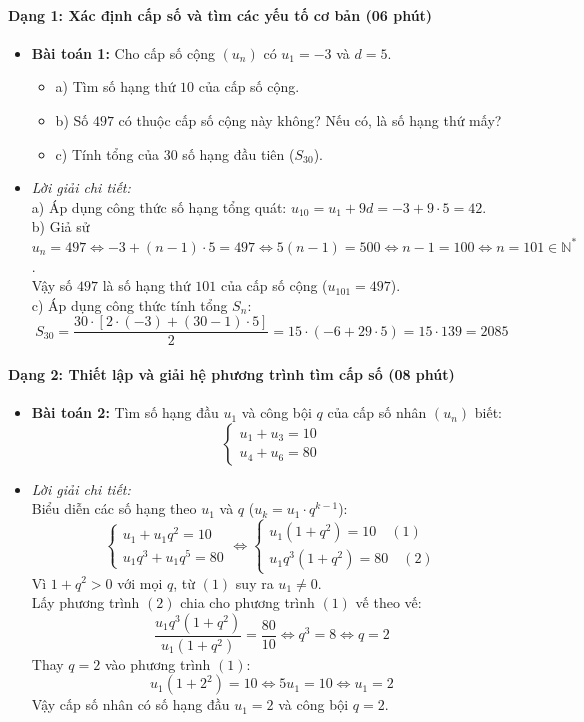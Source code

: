 \documentclass[12pt, a4paper]{article}
\begin{document}
\paragraph{Dạng 1: Xác định cấp số và tìm các yếu tố cơ bản (06 phút)}
\begin{itemize}
    \item \textbf{Bài toán 1:} Cho cấp số cộng $(u_n)$ có $u_1 = -3$ và $d = 5$.
    \begin{itemize}
        \item a) Tìm số hạng thứ $10$ của cấp số cộng.
        \item b) Số $497$ có thuộc cấp số cộng này không? Nếu có, là số hạng thứ mấy?
        \item c) Tính tổng của $30$ số hạng đầu tiên ($S_{30}$).
    \end{itemize}
    \item \textit{Lời giải chi tiết:}\\
    a) Áp dụng công thức số hạng tổng quát: $u_{10} = u_1 + 9d = -3 + 9 \cdot 5 = 42$.\\
    b) Giả sử $u_n = 497 \iff -3 + (n - 1) \cdot 5 = 497 \iff 5(n - 1) = 500 \iff n - 1 = 100 \iff n = 101 \in \mathbb{N}^*$.\\
    Vậy số $497$ là số hạng thứ $101$ của cấp số cộng ($u_{101} = 497$).\\
    c) Áp dụng công thức tính tổng $S_n$:
    $$S_{30} = \dfrac{30 \cdot [2 \cdot (-3) + (30 - 1) \cdot 5]}{2} = 15 \cdot (-6 + 29 \cdot 5) = 15 \cdot 139 = 2085$$
\end{itemize}

\paragraph{Dạng 2: Thiết lập và giải hệ phương trình tìm cấp số (08 phút)}
\begin{itemize}
    \item \textbf{Bài toán 2:} Tìm số hạng đầu $u_1$ và công bội $q$ của cấp số nhân $(u_n)$ biết:
    $$\begin{cases} u_1 + u_3 = 10 \\ u_4 + u_6 = 80 \end{cases}$$
    \item \textit{Lời giải chi tiết:}\\
    Biểu diễn các số hạng theo $u_1$ và $q$ ($u_k = u_1 \cdot q^{k-1}$):
    $$\begin{cases} u_1 + u_1 q^2 = 10 \\ u_1 q^3 + u_1 q^5 = 80 \end{cases} \iff \begin{cases} u_1(1 + q^2) = 10 \quad (1) \\ u_1 q^3(1 + q^2) = 80 \quad (2) \end{cases}$$
    Vì $1 + q^2 > 0$ với mọi $q$, từ $(1)$ suy ra $u_1 \neq 0$.\\
    Lấy phương trình $(2)$ chia cho phương trình $(1)$ vế theo vế:
    $$\dfrac{u_1 q^3 (1 + q^2)}{u_1 (1 + q^2)} = \dfrac{80}{10} \iff q^3 = 8 \iff q = 2$$
    Thay $q = 2$ vào phương trình $(1)$:
    $$u_1 (1 + 2^2) = 10 \iff 5u_1 = 10 \iff u_1 = 2$$
    Vậy cấp số nhân có số hạng đầu $u_1 = 2$ và công bội $q = 2$.
\end{itemize}
\end{document}
